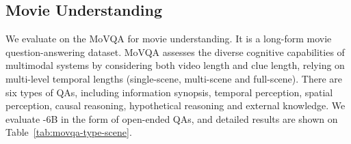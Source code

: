 \subsection{Movie Understanding}

We evaluate {\modelname} on the MoVQA for movie understanding. It is a long-form movie question-answering dataset\cite{zhang2023movqa}. MoVQA assesses the diverse cognitive capabilities of multimodal systems by considering both video length and clue length, relying on multi-level temporal lengths (single-scene, multi-scene and full-scene). 
There are six types of QAs, including information synopsis, temporal perception, spatial perception, causal reasoning, hypothetical reasoning and external knowledge.
We evaluate {\modelname}-6B in the form of open-ended QAs, and detailed results are shown on Table~\ref{tab:movqa-type-scene}.